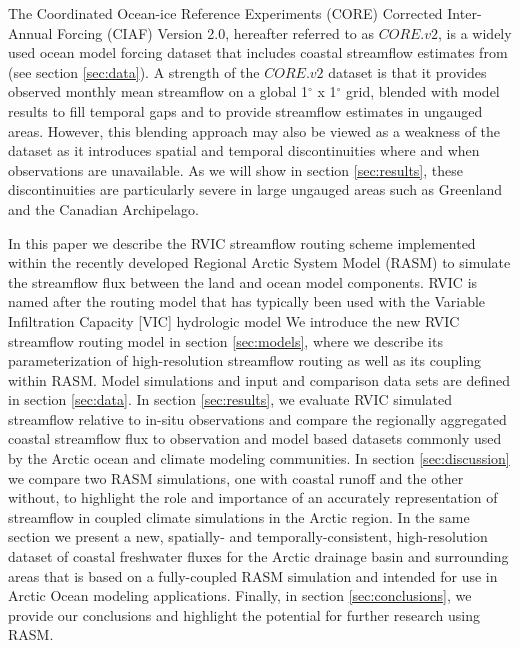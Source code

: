 \documentclass[jgrga, draft]{agutex}
\begin{document}
\begin{article}
The Coordinated Ocean-ice Reference Experiments (CORE) Corrected Inter-Annual Forcing (CIAF) Version 2.0, hereafter referred to as $CORE.v2$, is a widely used ocean model forcing dataset that includes coastal streamflow estimates from \citet{Dai_2009} (see section \ref{sec:data}).
A strength of the $CORE.v2$ dataset is that it provides observed monthly mean streamflow on a global 1$^{\circ}$ x 1$^{\circ}$ grid, blended with model results to fill temporal gaps and to provide streamflow estimates in ungauged areas.
However, this blending approach may also be viewed as a weakness of the dataset as it introduces spatial and temporal discontinuities where and when observations are unavailable.
As we will show in section \ref{sec:results}, these discontinuities are particularly severe in large ungauged areas such as Greenland and the Canadian Archipelago.

In this paper we describe the RVIC streamflow routing scheme implemented within the recently developed Regional Arctic System Model (RASM) \citep{Roberts_2015a,DuVivier_2016,Hamman_2016} to simulate the streamflow flux between the land and ocean model components.
RVIC is named after the routing model that has typically been used with the Variable Infiltration Capacity [VIC] hydrologic model %
We introduce the new RVIC streamflow routing model in section \ref{sec:models}, where we describe its parameterization of high-resolution streamflow routing as well as its coupling within RASM.
Model simulations and input and comparison data sets are defined in section \ref{sec:data}.
In section \ref{sec:results}, we evaluate RVIC simulated streamflow relative to in-situ observations and compare the regionally aggregated coastal streamflow flux to observation and model based datasets commonly used by the Arctic ocean and climate modeling communities.
In section \ref{sec:discussion} we compare two RASM simulations, one with coastal runoff and the other without, to highlight the role and importance of an accurately representation of streamflow in coupled climate simulations in the Arctic region.
In the same section we present a new, spatially- and temporally-consistent, high-resolution dataset of coastal freshwater fluxes for the Arctic drainage basin and surrounding areas that is based on a fully-coupled RASM simulation and intended for use in Arctic Ocean modeling applications.
Finally, in section \ref{sec:conclusions}, we provide our conclusions and highlight the potential for further research using RASM. %


\end{article}
\end{document}
